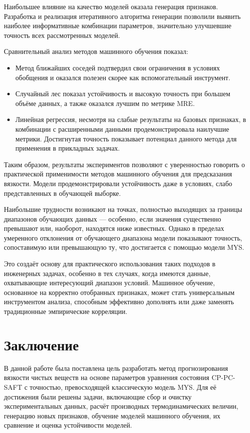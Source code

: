\documentclass[a4paper,12pt]{article}
\begin{document}
    Наибольшее влияние на качество моделей оказала генерация признаков. Разработка и реализация итеративного алгоритма генерации позволили выявить наиболее информативные комбинации параметров, значительно улучшевшие точность всех рассмотренных моделей.
    
    Сравнительный анализ методов машинного обучения показал:
    \begin{itemize}
      \item Метод ближайших соседей подтвердил свои ограничения в условиях обобщения и оказался полезен скорее как вспомогательный инструмент.
      \item Случайный лес показал устойчивость и высокую точность при большем объёме данных, а также оказался лучшим по метрике MRE.
      \item Линейная регрессия, несмотря на слабые результаты на базовых признаках, в комбинации с расширенными данными продемонстрировала наилучшие метрики. Достигнутая точность показывает потенциал данного метода для применения в прикладных задачах.
    \end{itemize}

    Таким образом, результаты экспериментов позволяют с уверенностью говорить о практической применимости методов машинного обучения для предсказания вязкости. Модели продемонстрировали устойчивость даже в условиях, слабо представленных в обучающей выборке.

  Наибольшие трудности возникают на точках, полностью выходящих за границы диапазонов обучающих данных — особенно, если значения существенно превышают или, наоборот, находятся ниже известных. Однако в пределах умеренного отклонения от обучающего диапазона модели показывают точность, сопоставимую или превышающую ту, что достигается с помощью модели MYS.

  Это создаёт основу для практического использования таких подходов в инженерных задачах, особенно в тех случаях, когда имеются данные, охватывающие интересующий диапазон условий. Машинное обучение, основанное на корректно отобранных признаках, может стать универсальным инструментом анализа, способным эффективно дополнять или даже заменять традиционные эмпирические корреляции.

\section*{Заключение}

  В данной работе была поставлена цель разработать метод прогнозирования вязкости чистых веществ на основе параметров уравнения состояния CP-PC-SAFT с точностью, превосходящей классическую модель MYS. Для её достижения были решены задачи, включающие сбор и очистку экспериментальных данных, расчёт производных термодинамических величин, генерацию новых признаков, обучение моделей машинного обучения, их сравнение и оценка устойчивости моделей.
\end{document}
